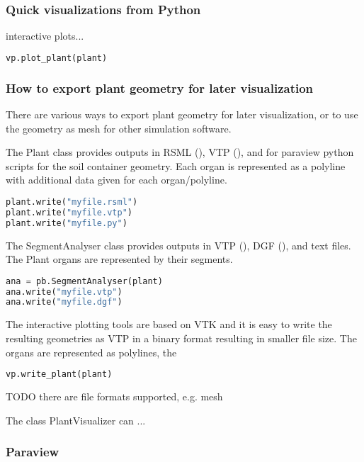 \subsubsection*{Quick visualizations from Python}

interactive plots...

\begin{lstlisting}[language=Python]
vp.plot_plant(plant)
\end{lstlisting}

\subsubsection*{How to export plant geometry for later visualization} \label{ssec:export}

There are various ways to export plant geometry for later visualization, or to use the geometry as mesh for other simulation software.

The Plant class provides outputs in RSML (), VTP (), and for paraview python scripts for the soil container geometry. Each organ is represented as a polyline with additional data given for each organ/polyline.

\begin{lstlisting}[language=Python]
plant.write("myfile.rsml")
plant.write("myfile.vtp")
plant.write("myfile.py")
\end{lstlisting}

The SegmentAnalyser class provides outputs in VTP (), DGF (), and text files. The Plant organs are represented by their segments.
\begin{lstlisting}[language=Python]
ana = pb.SegmentAnalyser(plant)
ana.write("myfile.vtp")
ana.write("myfile.dgf")
\end{lstlisting}


The interactive plotting tools are based on VTK and it is easy to write the resulting geometries as VTP in a binary format resulting in smaller file size. The organs are represented as polylines, the
\begin{lstlisting}[language=Python]
vp.write_plant(plant)
\end{lstlisting}
TODO there are file formats supported, e.g. mesh


The class PlantVisualizer can ...




\subsubsection*{Paraview}

